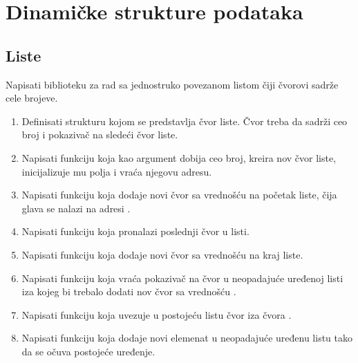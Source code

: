 
\chapter{Dinamičke strukture podataka}

\section{Liste}

\begin{Exercise}[label=601]
Napisati biblioteku za rad sa jednostruko povezanom listom čiji čvorovi sadrže cele brojeve. 
\begin{enumerate}
\item Definisati strukturu  kojom se predstavlja čvor liste. Čvor treba da sadrži ceo broj  i pokazivač na sledeći čvor liste.

\item Napisati funkciju  koja kao argument dobija ceo broj, kreira nov čvor liste, inicijalizuje mu polja i vraća njegovu adresu.

 \item Napisati funkciju  koja dodaje novi čvor sa vrednošću  na početak liste, čija glava se nalazi na adresi .

 \item Napisati funkciju  koja pronalazi poslednji čvor u listi.

 \item Napisati funkciju  koja dodaje novi čvor sa vrednošću  na kraj liste.

 \item Napisati funkciju  koja vraća pokazivač na čvor u neopadajuće uređenoj listi iza kojeg bi trebalo dodati nov čvor sa vrednošću .

 \item Napisati funkciju  koja uvezuje u postojeću listu čvor  iza čvora .

 \item Napisati funkciju  koja dodaje novi elemenat u neopadajuće uređenu listu tako da se očuva postojeće uređenje.


\end{enumerate}
\end{Exercise}
